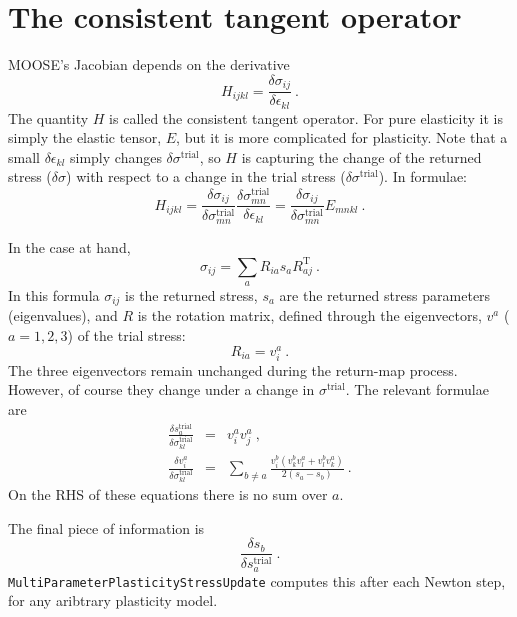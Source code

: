 \documentclass[]{scrreprt}
\begin{document}
\section{The consistent tangent operator}
MOOSE's Jacobian depends on the derivative
\begin{equation}
H_{ijkl} = \frac{\delta\sigma_{ij}}{\delta \epsilon_{kl}} \ .
\end{equation}
The quantity $H$ is called the consistent tangent operator.  For pure
elasticity it is simply the elastic tensor, $E$, but it is more
complicated for plasticity.  Note that a small $\delta\epsilon_{kl}$
simply changes $\delta\sigma^{\mathrm{trial}}$, so $H$ is capturing the
change of the returned stress ($\delta\sigma$) with respect to a
change in the trial stress ($\delta\sigma^{\mathrm{trial}}$).  In formulae:
\begin{equation}
  H_{ijkl} = \frac{\delta\sigma_{ij}}{\delta
    \sigma_{mn}^{\mathrm{trial}}}
  \frac{\delta\sigma_{mn}^{\mathrm{trial}}}{\delta\epsilon_{kl}} =\frac{\delta\sigma_{ij}}{\delta
    \sigma_{mn}^{\mathrm{trial}}} E_{mnkl} \ .
\end{equation}

In the case at hand,
\begin{equation}
  \sigma_{ij} = \sum_{a}R_{ia}s_{a}R_{aj}^{\mathrm{T}} \ .
\end{equation}
In this formula $\sigma_{ij}$ is the returned stress, $s_{a}$ are the
returned stress parameters (eigenvalues), and $R$ is the rotation
matrix, defined through the eigenvectors, $v^{a}$ ($a=1,2,3$) of the
trial stress:
\begin{equation}
  R_{ia} = v^{a}_{i} \ .
\end{equation}
The three eigenvectors remain unchanged during the return-map
process.  However, of course they change under a change in
$\sigma^{\mathrm{trial}}$.  The relevant formulae are
\begin{eqnarray}
  \frac{\delta s_{a}^{\mathrm{trial}}}{\delta
    \sigma_{kl}^{\mathrm{trial}}} & = & v^{a}_{i}v^{a}_{j} \ , \\
  \frac{\delta v^{a}_{i}}{\delta \sigma_{kl}^{\mathrm{trial}}} & = &
  \sum_{b\neq a}\frac{v_{i}^{b}(v_{k}^{b}v_{l}^{a} +
    v_{l}^{b}v_{k}^{a})}{2(s_{a}-s_{b})} \ .
\end{eqnarray}
On the RHS of these equations there is no sum over $a$.

The final piece of information is
\begin{equation}
  \frac{\delta s_{b}}{\delta s_{a}^{\mathrm{trial}}} \ .
\end{equation}
{\tt MultiParameterPlasticityStressUpdate} computes this after each
Newton step, for any aribtrary plasticity model.
\end{document}
